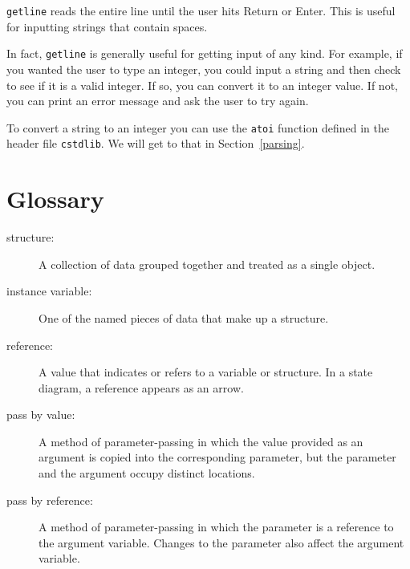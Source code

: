 {\tt getline} reads the entire line until the user hits
Return or Enter.  This is useful for inputting strings that
contain spaces.

In fact, {\tt getline} is generally useful for getting input
of any kind.  For example, if you wanted the user to type an
integer, you could input a string and then check to see if
it is a valid integer.  If so, you can convert it to an integer
value.  If not, you can print an error message and ask the user
to try again.

To convert a string to an integer you can use the {\tt atoi}
function defined in the header file {\tt cstdlib}.  We will
get to that in Section~\ref{parsing}.

\section{Glossary}

\begin{description}

\item[structure:]  A collection of data grouped together and
treated as a single object.

\item[instance variable:]  One of the named pieces of data that make up
a structure.

\item[reference:]  A value that indicates or refers to a variable
or structure.  In a state diagram, a reference appears as an arrow.

\item[pass by value:]  A method of parameter-passing in which the
value provided as an argument is copied into the corresponding
parameter, but the parameter and the argument occupy distinct
locations.

\item[pass by reference:]  A method of parameter-passing in which
the parameter is a reference to the argument variable.  Changes
to the parameter also affect the argument variable.


\end{description}

